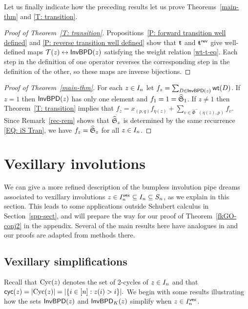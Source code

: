 \documentclass[10pt]{article}
\begin{document}
Let us finally indicate how the preceding results let us prove Theorems~\ref{main-thm} and \ref{T: transition}.

\begin{proof}[Proof of Theorem~\ref{T: transition}]
Propositions~\ref{P: forward transition well defined} and \ref{P: reverse transition well defined} show that  $\mathbf t 
$ and $\mathbf t^{\mathsf{rev}}$ give well-defined maps $\mathcal{T}(z) \leftrightarrow \mathsf{InvBPD}(z)$ satisfying the weight relation \eqref{wt-t-eq}.
Each step
in the definition of one operator
reverses the corresponding step
in the definition of the other, so
these maps are inverse bijections.
\end{proof}

\begin{proof}[Proof of Theorem~\ref{main-thm}]
For each $z \in I_n$ let $f_z = \sum_{D \in \mathsf{InvBPD}(z)}\mathsf{wt}(D)$.
If $z=1$ then $\mathsf{InvBPD}(z)$ has only one element 
and  $f_1=1 = \widehat{\mathfrak S}_1$.
If $z\neq 1$ then Theorem~\ref{T: transition}
implies that 
$
f_z
=
x_{(p,q)}f_{\eta(z)}
+
\sum_{v\in\hat\Phi^{-}(\eta(z),p)}
f_v.
$
Since Remark~\ref{rec-rem} shows that $\widehat{\mathfrak S}_z$ is  determined by the same recurrence \eqref{EQ: iS Tran}, we have $f_z=\widehat{\mathfrak S}_z$ for all $z \in I_n$.
\end{proof}

\section{Vexillary involutions}\label{vex-sect}


We can give a more refined description of the bumpless involution pipe dreams associated
to vexillary involutions $z \in I^{\mathsf{vex}}_n\subseteq I_n\subseteq S_n$, as we explain in this section.
This leads to some applications outside Schubert calculus in Section~\ref{spp-sect}, and will prepare the way for our proof of Theorem~\ref{fkGO-conj2} in the appendix.
Several of the main results here have analogues in \cite[\S7]{Weigandt}
and our proofs are adapted from methods there.

\subsection{Vexillary simplifications}

Recall that $\mathrm{Cyc}(z)$ denotes the set of 2-cycles of $z \in I_n$ and 
that
$\textsf{cyc}(z) = |\mathrm{Cyc}(z)|
= |\{ i \in [n] : z(i) > i\}|
.$
We begin with some results illustrating how the sets $\mathsf{InvBPD}(z)$ and $\mathsf{InvBPD}_K(z)$ simplify when $z \in I^{\mathsf{vex}}_n$.
\end{document}
